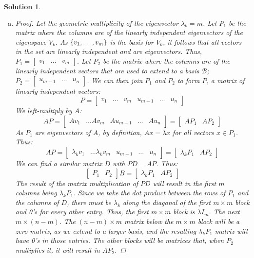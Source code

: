 \documentclass[11pt]{scrartcl}
\theoremstyle{dotlessP}
\newtheorem{sol}{Solution}[section]
\theoremstyle{dotlessN}
\DeclarePairedDelimiter\set{\{}{\}}
\newcommand{\basis}{\mathcal{B}}
\begin{document}
	\begin{sol}
		\
		\begin{enumerate}[(a)]
			\item
\begin{proof}
				Let the geometric multiplicity of the eigenvector $\lambda_k = m$. Let $P_1$ be the matrix where the columns are of the linearly independent eigenvectors of the eigenspace $V_k$. As $\set*{v_1, \dots, v_m}$ is the basis for $V_k$, it follows that all vectors in the set are linearly independent and are eigenvectors. Thus, $P_1 = 
\begin{bmatrix}
	v_1 & \dots & v_m
\end{bmatrix}
				$. Let $P_2$ be the matrix where the columns are of the linearly independent vectors that are used to extend to a basis $\basis$; $P_2 =
\begin{bmatrix}
	u_{m+1} & \dots & u_n
\end{bmatrix}
				$. We can then join $P_1$ and $P_2$ to form $P$, a matrix of linearly independent vectors:
				\[
				P = 
				\begin{bmatrix}
					v_1 & \dots & v_m & u_{m+1} & \dots & u_n
				\end{bmatrix}
				\] 
We left-multiply by $A$:
\[
AP = 
\begin{bmatrix}
	Av_1 & \dots Av_m & Au_{m+1} & \dots & Au_n	
\end{bmatrix} = 
\begin{bmatrix}
	AP_1 & AP_2
\end{bmatrix}
\] 
As $P_1$ are eigenvectors of $A$, by definition, $Ax = \lambda x$ for all vectors $x \in P_1$. Thus:
\[
AP = 
\begin{bmatrix}
	\lambda_k v_1 & \dots \lambda_k v_m & u_{m+1} & \dots & u_n
\end{bmatrix} =
\begin{bmatrix}
	\lambda_k P_1 & AP_2	
\end{bmatrix} 
\]
We can find a similar matrix $D$ with $PD = AP$. Thus:
 \[
\begin{bmatrix}
	P_1 & P_2
\end{bmatrix}B
 =
\begin{bmatrix}
	\lambda_k P_1 & AP_2	
\end{bmatrix} 
\]
The result of the matrix multiplication of $PD$ will result in the first $m$ columns being $\lambda_k P_1$. Since we take the dot product between the rows of $P_1$ and the columns of $D$, there must be $\lambda_k$ along the diagonal of the first $m \times m$ block and 0's for every other entry. Thus, the first $m \times m$ block is $\lambda I_m$. The next $m \times (n-m)$. The $(n-m)\times m$ matrix below the $m \times m$ block will be a zero matrix, as we extend to a larger basis, and the resulting $\lambda_k P_1$ matrix will have 0's in those entries. The other blocks will be matrices that, when $P_2$ multiplies it, it will result in $AP_2$.

\end{proof}
\end{enumerate}
\end{sol}
\end{document}
